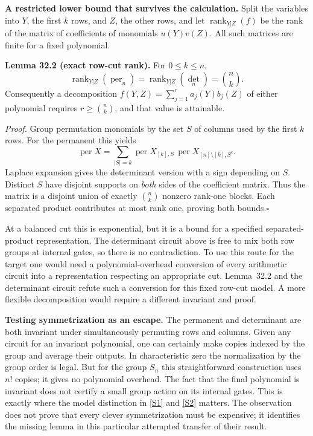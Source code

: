 \documentclass[11pt,a4paper]{article}
\newcommand{\sref}[2]{\hyperlink{source:#1:#2}{[S#2]}}
\numberwithin{equation}{section}
\begin{document}
\medskip
\textbf{A restricted lower bound that survives the calculation.}
Split the variables into $Y$, the first $k$ rows, and $Z$, the other rows,
and let $\operatorname{rank}_{Y|Z}(f)$ be the rank of the matrix of coefficients
of monomials $u(Y)v(Z)$. All such matrices are finite for a fixed polynomial.

\textbf{Lemma 32.2 (exact row-cut rank).}
For $0\le k\le n$,
\begin{equation}\label{r32:cut}
 \operatorname{rank}_{Y|Z}(\operatorname{per}_n)
 =\operatorname{rank}_{Y|Z}(\det_n)=\binom nk.
\end{equation}
Consequently a decomposition
$f(Y,Z)=\sum_{j=1}^r a_j(Y)b_j(Z)$ of either polynomial requires
$r\ge\binom nk$, and that value is attainable.

\emph{Proof.} Group permutation monomials by the set $S$ of columns used
by the first $k$ rows. For the permanent this yields
\[
 \operatorname{per}X=\sum_{|S|=k}
     \operatorname{per}X_{[k],S}\,
     \operatorname{per}X_{[n]\setminus[k],S^c}.
\]
Laplace expansion gives the determinant version with a sign depending on
$S$. Distinct $S$ have disjoint supports on \emph{both} sides of the
coefficient matrix. Thus the matrix is a disjoint union of exactly
$\binom nk$ nonzero rank-one blocks. Each separated product contributes
at most rank one, proving both bounds.\hfill$\square$

At a balanced cut this is exponential, but it is a bound for a specified
separated-product representation. The determinant circuit above is free
to mix both row groups at internal gates, so there is no contradiction.
To use this route for the target one would need a polynomial-overhead
conversion of every arithmetic circuit into a representation respecting
an appropriate cut. Lemma~32.2 and the determinant circuit refute such a
conversion for this fixed row-cut model. A more flexible decomposition
would require a different invariant and proof.

\medskip
\textbf{Testing symmetrization as an escape.}
The permanent and determinant are both invariant under simultaneously
permuting rows and columns. Given any circuit for an invariant polynomial,
one can certainly make copies indexed by the group and average their
outputs. In characteristic zero the normalization by the group order is
legal. But for the group $S_n$ this straightforward construction uses
$n!$ copies; it gives no polynomial overhead. The fact that the final
polynomial is invariant does not certify a small group action on its
internal gates. This is exactly where the model distinction in
\sref{30001375}{1} and \sref{30001375}{2} matters. The observation does not prove that
every clever symmetrization must be expensive; it identifies the missing
lemma in this particular attempted transfer of their result.
\end{document}
